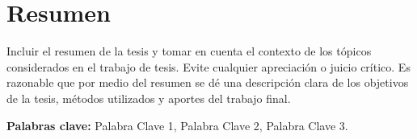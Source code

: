 \chapter*{Resumen}
Incluir el resumen de la tesis y tomar en cuenta el contexto de los t\'opicos
considerados en el trabajo de tesis.
Evite cualquier apreciaci\'on o juicio cr\'itico.
Es razonable que por medio del resumen se d\'e una descripci\'on clara
de los objetivos de la tesis, m\'etodos utilizados y aportes del trabajo
final. 

\bigskip
\textbf{Palabras clave:} Palabra Clave 1, Palabra Clave 2, Palabra Clave 3.
